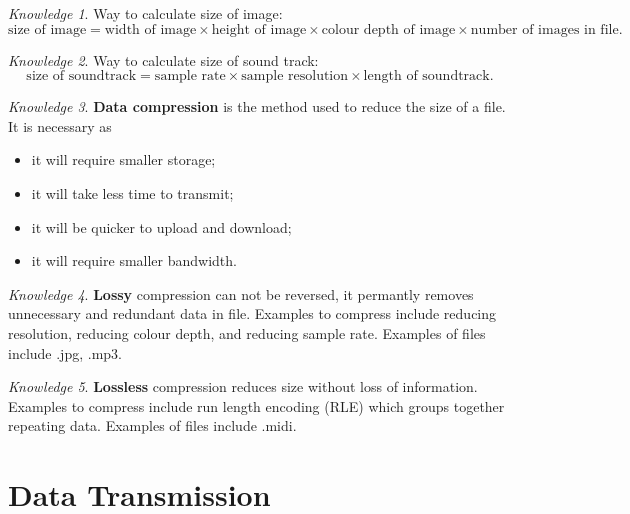 \documentclass[8pt]{article}
\theoremstyle{remark}
\newtheorem{knowledge}{Knowledge}[subsection]
\begin{document}
        \begin{knowledge}
            Way to calculate size of image:
            \[
                \text{size of image} = \text{width of image} \times \text{height of image} \times \text{colour depth of image} \times \text{number of images in file}.
            \]
        \end{knowledge}

        \begin{knowledge}
            Way to calculate size of sound track:
            \[
                \text{size of soundtrack} = \text{sample rate} \times \text{sample resolution} \times \text{length of soundtrack}.
            \]
        \end{knowledge}

        \begin{knowledge}
            \textbf{Data compression} is the method used to reduce the size of a file. It is necessary as
            \begin{itemize}
                \item it will require smaller storage;
                \item it will take less time to transmit;
                \item it will be quicker to upload and download;
                \item it will require smaller bandwidth.
            \end{itemize}
        \end{knowledge}

        \begin{knowledge}
            \textbf{Lossy} compression can not be reversed, it permantly removes unnecessary and redundant data in file. Examples to compress include reducing resolution, reducing colour depth, and reducing sample rate. Examples of files include .jpg, .mp3.
        \end{knowledge}

        \begin{knowledge}
            \textbf{Lossless} compression reduces size without loss of information. Examples to compress include run length encoding (RLE) which groups together repeating data. Examples of files include .midi.
        \end{knowledge}

    \section{Data Transmission}
\end{document}
